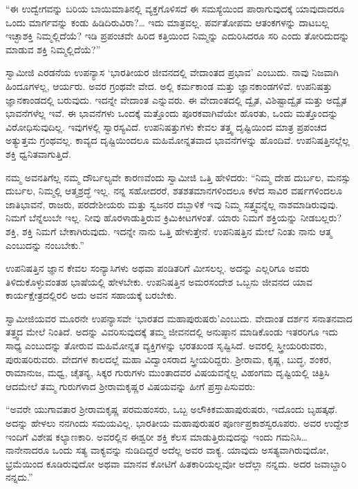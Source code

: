  “ಈ ಉದ್ವೇಗವನ್ನು ಬರಿಯ ಬಾಯಿಮಾತಿನಲ್ಲಿ ವ್ಯಕ್ತಗೊಳಿಸದೆ ಈ ಸಮಸ್ಯೆಯಿಂದ ಪಾರಾಗುವುದಕ್ಕೆ ಯಾವುದಾದರೂ ಒಂದು ಮಾರ್ಗವನ್ನು ಕಂಡು ಹಿಡಿದಿರುವಿರಾ?… ಇದು ಮಾತ್ರವಲ್ಲ. ಪರ್ವತೋಪಮ ಆತಂಕಗಳನ್ನು ದಾಟಬಲ್ಲ ಇಚ್ಛಾಶಕ್ತಿ ನಿಮ್ಮಲ್ಲಿದೆಯೆ? ಇಡಿ ಪ್ರಪಂಚವೇ ಹಿರಿದ ಕತ್ತಿಯಿಂದ ನಿಮ್ಮನ್ನು ಎದುರಿಸಿದರೂ ಸರಿ ಎಂದು ತೋರಿದುದನ್ನು ಮಾಡುವ ಶಕ್ತಿ ನಿಮ್ಮಲ್ಲಿದೆಯೆ?” 

 ಸ್ವಾಮೀಜಿ ಎರಡನೆಯ ಉಪನ್ಯಾಸ ‘ಭಾರತೀಯರ ಜೀವನದಲ್ಲಿ ವೇದಾಂತದ ಪ್ರಭಾವ’ ಎಂಬುದು. ನಾವು ನಿಜವಾಗಿ ಹಿಂದೂಗಳಲ್ಲ, ಆರ್ಯರು. ಅವರ ಗ್ರಂಥವೇ ವೇದ. ಅಲ್ಲಿ ಕರ್ಮಕಾಂಡ ಮತ್ತು ಜ್ಞಾನಕಾಂಡಗಳಿವೆ. ಉಪನಿಷತ್ತು ಜ್ಞಾನಕಾಂಡದಲ್ಲಿ ಬರುವುದು. ಇದನ್ನೇ ವೇದಾಂತ ಎನ್ನುವರು. ಈ ವೇದಾಂತದಲ್ಲಿ ದ್ವೈತ, ವಿಶಿಷ್ಟಾದ್ವೈತ ಮತ್ತು ಅದ್ವೈತ ಭಾವನೆಗಳೆಲ್ಲ ಇವೆ. ಈ ಭಾವನೆಗಳು ಒಂದಕ್ಕೆ ಮತ್ತೊಂದು ಪೂರಕವಾಗಿವೆಯೇ ಹೊರತು, ಒಂದು ಮತ್ತೊಂದನ್ನು ವಿರೋಧಿಸುವುದಿಲ್ಲ. ಇವುಗಳಲ್ಲಿ ಸ್ವಾರಸ್ಯವಿದೆ. ಉಪನಿಷತ್ತುಗಳು ಕೇವಲ ತತ್ತ್ವ ದೃಷ್ಟಿಯಿಂದ ಮಾತ್ರ ಪ್ರಪಂಚದ ಅತ್ಯುತ್ತಮ ಗ್ರಂಥವಲ್ಲ. ಕಾವ್ಯದ ದೃಷ್ಟಿಯಿಂದಲೂ ಮಹಿಮೋನ್ನತವಾದ ಭಾವನೆಗಳನ್ನು ಹೊಂದಿವೆ. ಉಪನಿಷತ್ತಿನಲ್ಲೆಲ್ಲ ಶಕ್ತಿ ಧ್ವನಿತವಾಗುತ್ತಿದೆ. 

 ನಮ್ಮ ಅವನತಿಗೆಲ್ಲ ನಮ್ಮ ದೌರ್ಬಲ್ಯವೇ ಕಾರಣವೆಂದು ಸ್ವಾಮೀಜಿ ಒತ್ತಿ ಹೇಳಿದರು: “ನಿಮ್ಮ ದೇಹ ದುರ್ಬಲ, ಮನಸ್ಸು ದುರ್ಬಲ, ನಿಮ್ಮಲ್ಲಿ ಆತ್ಮಶ್ರದ್ಧೆ ಇಲ್ಲ. ನನ್ನ ಸಹೋದರರೆ, ಶತಶತಮಾನಗಳಿಂದಲೂ ಕಳೆದ ಸಾವಿರ ವರ್ಷಗಳಿಂದಲೂ ಜಾತಿಭಾವನೆ, ರಾಜರು, ಪರದೇಶೀಯರು ಮತ್ತು ಸ್ವಜನರ ದಬ್ಬಾಳಿಕೆ ಇವು ನಿಮ್ಮ ಸತ್ತ್ವವನ್ನೆಲ್ಲ ನಾಶಮಾಡಿರುವುವು. ನಿಮಗೆ ಬೆನ್ನೆಲುಬೇ ಇಲ್ಲ. ನೀವು ಹೊರಳಾಡುತ್ತಿರುವ ಕ್ರಿಮಿಕೀಟಗಳಂತೆ. ಯಾರು ನಿಮಗೆ ಶಕ್ತಿಯನ್ನು ನೀಡಬಲ್ಲರು? ಶಕ್ತಿ, ಶಕ್ತಿ ನಿಮಗೆ ಬೇಕಾಗಿರುವುದು. ಇದನ್ನೇ ನಾನು ಒತ್ತಿ ಹೇಳುತ್ತೇನೆ. ಉಪನಿಷತ್ತಿನ ಮೇಲೆ ನಿಂತು ನಾನು ಆತ್ಮ ಎಂಬುದನ್ನು ನಂಬಬೇಕು.” 

 ಉಪನಿಷತ್ತಿನ ಜ್ಞಾನ ಕೇವಲ ಸಂನ್ಯಾಸಿಗಳು ಅಥವಾ ಪಂಡಿತರಿಗೆ ಮೀಸಲಲ್ಲ. ಅದನ್ನು ಎಲ್ಲರಿಗೂ ಅವರು ತಿಳಿದುಕೊಳ್ಳುವಂತಹ ಭಾಷೆಯಲ್ಲಿ ಹೇಳಬೇಕು. ಉಪನಿಷತ್ತಿನ ಅಮರಸಂದೇಶ ಒಬ್ಬನು ಜೀವನದ ಯಾವ ಕಾರ್ಯಕ್ಷೇತ್ರದಲ್ಲಿರಲಿ ಅದು ಅವನ ಸಹಾಯಕ್ಕೆ ಬರಬೇಕು. 

 ಸ್ವಾಮೀಜಿಯವರ ಮೂರನೇ ಉಪನ್ಯಾಸವೇ ‘ಭಾರತದ ಮಹಾಪುರುಷರು’\break ಎಂಬುದು. ವೇದಾಂತ ದರ್ಶನ ಸನಾತನವಾದ ತತ್ತ್ವದ ಮೇಲೆ ನಿಂತಿದೆ. ಅದನ್ನು ವಿವರಿಸುವುದಕ್ಕೆ ತಮ್ಮ ಜೀವನದಲ್ಲಿ ಅನುಷ್ಠಾನ ಮಾಡಿಕೊಂಡು ಇತರರಿಗೂ ಇದು ಸಾಧ್ಯ ಎಂಬುದನ್ನು ತೋರುವ ಮಹಿಮೋನ್ನತ ವ್ಯಕ್ತಿಗಳನ್ನು ಭರತಖಂಡ ಸೃಷ್ಟಿಸಿದೆ. ಅವರಲ್ಲಿ ಸ್ತ್ರೀಯರಿರುವರು, ಪುರುಷರಿರುವರು. ವೇದಗಳ ಕಾಲದಲ್ಲೆ ಮಹಾ ವಿದ್ವಾಂಸರಾದ ಸ್ತ್ರೀಯರಿದ್ದರು. ಶ‍್ರೀರಾಮ, ಕೃಷ್ಣ, ಬುದ್ಧ, ಶಂಕರ, ರಾಮಾನುಜ, ಮಧ್ವ, ಚೈತನ್ಯ, ಸಿಕ್ಕರ ಗುರುಗಳು ಮುಂತಾದವರ ವಿಷಯವನ್ನೆಲ್ಲ ವಿಹಂಗಮ ದೃಷ್ಟಿಯಲ್ಲಿ ಚಿತ್ರಿಸಿ ಆದಮೇಲೆ ತಮ್ಮ ಗುರುಗಳಾದ ಶ‍್ರೀರಾಮಕೃಷ್ಣರ ವಿಷಯವನ್ನು ಹೀಗೆ ಪ್ರಸ್ತಾಪಿಸುವರು: 

 “ಅವರೇ ಯುಗಾವತಾರ ಶ‍್ರೀರಾಮಕೃಷ್ಣ ಪರಮಹಂಸರು, ಒಬ್ಬ ಅಲೌಕಿಕ\break ಮಹಾಪುರುಷರು, ಇದೊಂದು ಬೃಹತ್ಕಥೆ. ಅದನ್ನು ಹೇಳಲು ನನಗಿಂದು ಸಮಯವಿಲ್ಲ. ಭಾರತೀಯ ಮಹಾಪುರುಷರ ಪೂರ್ಣಪ್ರಕಾಶಸ್ವರೂಪರು. ಅವರ ಉದ್ದೇಶ ಇಂದಿಗೆ ವಿಶೇಷ ಕಲ್ಯಾಣಕಾರಿ. ಅವರಲ್ಲಿನ ಈಶ್ವರೀ ಶಕ್ತಿ ಕೆಲಸ ಮಾಡುತ್ತಿರುವುದನ್ನು ಇಂದು ಗಮನಿಸಿ… ನಾನೇನಾದರೂ ಒಂದು ಸತ್ಯ ವಾಕ್ಯವನ್ನು ನುಡಿದಿದ್ದರೆ ಅದೆಲ್ಲ ಅವರ ವಾಕ್ಯ. ಯಾವುದು ಅಸತ್ಯವಾಗಿರುವುದೋ, ಭ್ರಮೆಯಿಂದ ಕೂಡಿರುವುದೋ ಅಥವಾ ಮಾನವ ಕೋಟಿಗೆ ಹಿತಕಾರಿಯಲ್ಲವೋ ಅದೆಲ್ಲಾ ನನ್ನದು. ಅದರ ಜವಾಬ್ದಾರಿ ನನ್ನದು.” 

